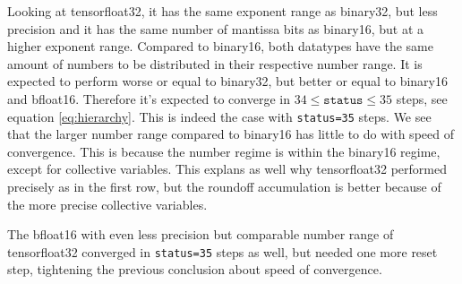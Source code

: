 \documentclass{article}
\theoremstyle{plain} %
\theoremstyle{remark} %
\def\code#1{\texttt{#1}}
\numberwithin{equation}{section}
\begin{document}
Looking at \gls{tensorfloat32}, it has the same exponent range as \gls{binary32}, but less precision and it has the same number of mantissa bits as \gls{binary16}, but at a higher exponent range. Compared to \gls{binary16}, both datatypes have the same amount of numbers to be distributed in their respective number range. It is expected to perform worse or equal to \gls{binary32}, but better or equal to \gls{binary16} and \gls{bfloat16}. Therefore it's expected to converge in $34 \le \code{status} \le 35$ steps, see equation \eqref{eq:hierarchy}. This is indeed the case with \code{status=35} steps. We see that the larger number range compared to \gls{binary16} has little to do with speed of convergence. This is because the number regime is within the \gls{binary16} regime, except for collective variables. This explans as well why \gls{tensorfloat32} performed precisely as in the first row, but the roundoff accumulation is better because of the more precise collective variables.

The \gls{bfloat16} with even less precision but comparable number range of \gls{tensorfloat32} converged in \code{status=35} steps as well, but needed one more reset step, tightening the previous conclusion about speed of convergence.
\end{document}
